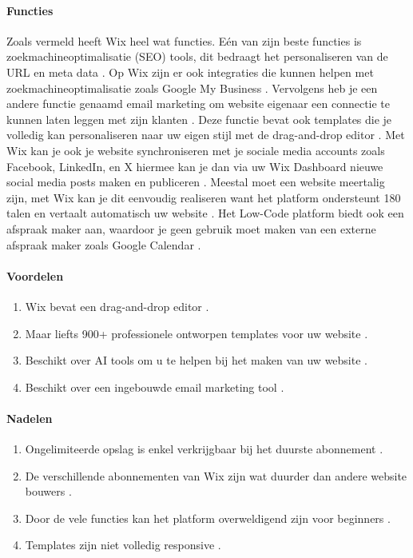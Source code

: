 \paragraph{Functies}
Zoals vermeld heeft Wix heel wat functies. Eén van zijn beste functies is zoekmachineoptimalisatie (SEO) tools, dit bedraagt het personaliseren van de URL en meta data \autocite{Ryan2024}.
Op Wix zijn er ook integraties die kunnen helpen met zoekmachineoptimalisatie zoals Google My Business \autocite{Ryan2024}. Vervolgens heb je een andere functie genaamd email marketing
om website eigenaar een connectie te kunnen laten leggen met zijn klanten \autocite{Ryan2024}. Deze functie bevat ook templates die je volledig kan personaliseren naar uw eigen stijl met de drag-and-drop editor \autocite{Ryan2024}.
Met Wix kan je ook je website synchroniseren met je sociale media accounts zoals Facebook, LinkedIn, en X hiermee kan je dan via uw Wix Dashboard nieuwe social media posts maken en publiceren \autocite{Ryan2024}.
Meestal moet een website meertalig zijn, met Wix kan je dit eenvoudig realiseren want het platform ondersteunt 180 talen en vertaalt automatisch uw website \autocite{Ryan2024}. Het Low-Code platform biedt ook een afspraak maker aan, waardoor je geen 
gebruik moet maken van een externe afspraak maker zoals Google Calendar \autocite{Singleton2024}. 
\paragraph*{Voordelen}
\begin{enumerate}
    \item Wix bevat een drag-and-drop editor \autocite{Ryan2024}.
    \item Maar liefts 900+ professionele ontworpen templates voor uw website \autocite{Ryan2024} \autocite{Singleton2024}.
    \item Beschikt over AI tools om u te helpen bij het maken van uw website \autocite{Ryan2024}.
    \item Beschikt over een ingebouwde email marketing tool \autocite{Singleton2024}.
\end{enumerate}


\paragraph*{Nadelen}
\begin{enumerate}
    \item Ongelimiteerde opslag is enkel verkrijgbaar bij het duurste abonnement \autocite{Ryan2024}.
    \item De verschillende abonnementen van Wix zijn wat duurder dan andere website bouwers \autocite{Ryan2024}.
    \item Door de vele functies kan het platform overweldigend zijn voor beginners \autocite{Ryan2024}.
    \item Templates zijn niet volledig responsive \autocite{Singleton2024}.
\end{enumerate}


